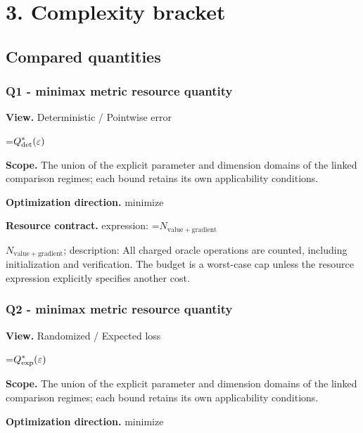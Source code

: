 \documentclass[10pt,a4paper]{article}
\newcommand{\AtlasMath}[1]{\par\begingroup\centering\setbox0=\hbox{$\displaystyle #1$}\ifdim\wd0>1.4\linewidth\typeout{ATLAS WIDE FORMULA: \the\wd0}\fi\ifdim\wd0>\linewidth\resizebox{\linewidth}{!}{\box0}\else\box0\fi\par\endgroup}
\newcommand{\AtlasInlineMath}[1]{\begingroup\setbox0=\hbox{$#1$}\ifdim\wd0>.4\linewidth\endgroup\AtlasMath{#1}\else\endgroup$#1$\fi}
\begin{document}
\section{3. Complexity bracket}


\subsection{Compared quantities}


\subsubsection{Q1 - minimax metric resource quantity}


\textbf{View.} Deterministic / Pointwise error



\AtlasMath{Q^*_{\rm det}(\varepsilon)}


\textbf{Scope.} The union of the explicit parameter and dimension domains of the linked comparison regimes; each bound retains its own applicability conditions.



\textbf{Optimization direction.} minimize



\textbf{Resource contract.} expression: \AtlasInlineMath{N_{\mathrm{value+gradient}}}; description: All charged oracle operations are counted, including initialization and verification. The budget is a worst-case cap unless the resource expression explicitly specifies another cost.



\subsubsection{Q2 - minimax metric resource quantity}


\textbf{View.} Randomized / Expected loss



\AtlasMath{Q^*_{\rm exp}(\varepsilon)}


\textbf{Scope.} The union of the explicit parameter and dimension domains of the linked comparison regimes; each bound retains its own applicability conditions.



\textbf{Optimization direction.} minimize
\end{document}
